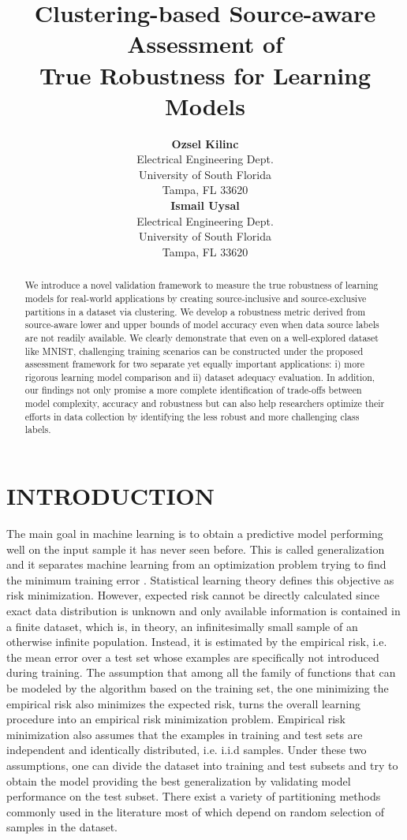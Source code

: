 \documentclass[letterpaper]{article}
\title{Clustering-based Source-aware Assessment of \\True Robustness for Learning Models}
\author{ {\bf Ozsel Kilinc} \\
Electrical Engineering Dept. \\
University of South Florida\\
Tampa, FL 33620 \\
\And
{\bf Ismail Uysal}  \\
Electrical Engineering Dept.\\
University of South Florida \\
Tampa, FL 33620 \\
}
\begin{document}
\maketitle

\begin{abstract}
We introduce a novel validation framework to measure the true robustness of learning models for real-world applications by creating source-inclusive and source-exclusive partitions in a dataset via clustering.    We develop a robustness metric derived from source-aware lower and upper bounds of model accuracy even when data source labels are not readily available. We clearly demonstrate that even on a well-explored dataset like MNIST, challenging training scenarios can be constructed under the proposed assessment framework for two separate yet equally important applications: i) more rigorous learning model comparison and ii) dataset adequacy evaluation.  In addition, our findings not only promise a more complete identification of trade-offs between model complexity, accuracy and robustness but can also help researchers optimize their efforts in data collection by identifying the less robust and more challenging class labels. 
\end{abstract}

\section{INTRODUCTION}

The main goal in machine learning is to obtain a predictive model performing well on the input sample it has never seen before. This is called generalization and it separates machine learning from an optimization problem trying to find the minimum training error \cite{Goodfellow-et-al-2016}. Statistical learning theory \cite{vapnik91} defines this objective as risk minimization. However, expected risk cannot be directly calculated since exact data distribution is unknown and only available information is contained in a finite dataset, which is, in theory, an infinitesimally small sample of an otherwise infinite population. Instead, it is estimated by the empirical risk, i.e. the mean error over a test set whose examples are specifically not introduced during training. The assumption that among all the family of functions that can be modeled by the algorithm based on the training set, the one minimizing the empirical risk also minimizes the expected risk, turns the overall learning procedure into an empirical risk minimization problem. Empirical risk minimization also assumes that the examples in training and test sets are independent and identically distributed, i.e. i.i.d samples. Under these two assumptions, one can divide the dataset into training and test subsets and try to obtain the model providing the best generalization by validating model performance on the test subset. There exist a variety of partitioning methods commonly used in the literature most of which depend on random selection of samples in the dataset.
\end{document}
